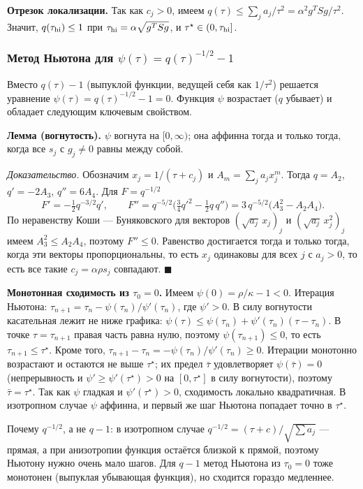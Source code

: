 \documentclass[11pt,a4paper]{article}
\begin{document}
\textbf{Отрезок локализации.} Так как $c_j>0$, имеем
$q(\tau)\le\sum_ja_j/\tau^2=\alpha^2g^TSg/\tau^2$. Значит, $q(\tau_{\rm hi})\le1$ при
$\tau_{\rm hi}=\alpha\sqrt{g^TSg}$, и $\tau^\star\in(0,\tau_{\rm hi}]$.

\subsubsection*{Метод Ньютона для $\psi(\tau)=q(\tau)^{-1/2}-1$}

Вместо $q(\tau)-1$ (выпуклой функции, ведущей себя как $1/\tau^2$) решается уравнение
$\psi(\tau)=q(\tau)^{-1/2}-1=0$. Функция $\psi$ возрастает ($q$ убывает) и обладает
следующим ключевым свойством.

\textbf{Лемма (вогнутость).} $\psi$ вогнута на $[0,\infty)$; она аффинна тогда и
только тогда, когда все $s_j$ с $g_j\ne0$ равны между собой.

\emph{Доказательство.} Обозначим $x_j=1/(\tau+c_j)$ и $A_m=\sum_ja_jx_j^m$. Тогда
$q=A_2$, $q'=-2A_3$, $q''=6A_4$. Для $F=q^{-1/2}$
\begin{equation*}
F'=-\tfrac12q^{-3/2}q',\qquad
F''=q^{-5/2}\Big(\tfrac34q'^2-\tfrac12q\,q''\Big)=3\,q^{-5/2}\big(A_3^2-A_2A_4\big).
\end{equation*}
По неравенству Коши — Буняковского для векторов $(\sqrt{a_j}\,x_j)_j$ и
$(\sqrt{a_j}\,x_j^2)_j$ имеем $A_3^2\le A_2A_4$, поэтому $F''\le0$. Равенство
достигается тогда и только тогда, когда эти векторы пропорциональны, то есть $x_j$
одинаковы для всех $j$ с $a_j>0$, то есть все такие $c_j=\alpha\rho s_j$ совпадают.
\hfill$\blacksquare$

\textbf{Монотонная сходимость из $\tau_0=0$.} Имеем $\psi(0)=\rho/\kappa-1<0$.
Итерация Ньютона: $\tau_{n+1}=\tau_n-\psi(\tau_n)/\psi'(\tau_n)$, где $\psi'>0$. В силу
вогнутости касательная лежит не ниже графика:
$\psi(\tau)\le\psi(\tau_n)+\psi'(\tau_n)(\tau-\tau_n)$. В точке $\tau=\tau_{n+1}$
правая часть равна нулю, поэтому $\psi(\tau_{n+1})\le0$, то есть
$\tau_{n+1}\le\tau^\star$. Кроме того,
$\tau_{n+1}-\tau_n=-\psi(\tau_n)/\psi'(\tau_n)\ge0$. Итерации монотонно возрастают и
остаются не выше $\tau^\star$; их предел $\bar\tau$ удовлетворяет $\psi(\bar\tau)=0$
(непрерывность и $\psi'\ge\psi'(\tau^\star)>0$ на $[0,\tau^\star]$ в силу вогнутости),
поэтому $\bar\tau=\tau^\star$. Так как $\psi$ гладкая и $\psi'(\tau^\star)>0$,
сходимость локально квадратичная. В изотропном случае $\psi$ аффинна, и первый же шаг
Ньютона попадает точно в $\tau^\star$.

Почему $q^{-1/2}$, а не $q-1$: в изотропном случае $q^{-1/2}=(\tau+c)/\sqrt{\sum a_j}$ —
прямая, а при анизотропии функция остаётся близкой к прямой, поэтому Ньютону нужно
очень мало шагов. Для $q-1$ метод Ньютона из $\tau_0=0$ тоже монотонен (выпуклая
убывающая функция), но сходится гораздо медленнее.
\end{document}
